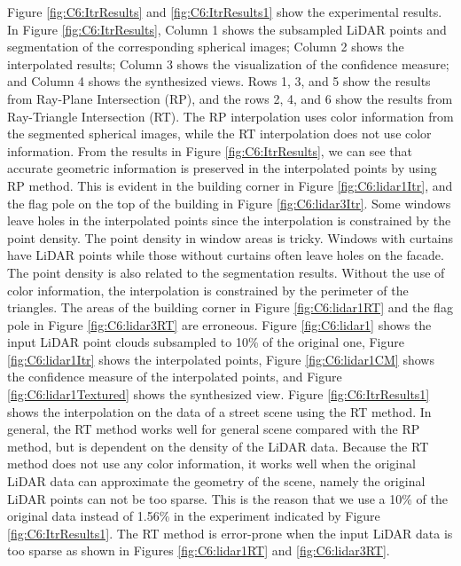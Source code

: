 Figure \ref{fig:C6:ItrResults} and \ref{fig:C6:ItrResults1}
show the experimental results. In Figure \ref{fig:C6:ItrResults},  Column 1 shows the subsampled LiDAR points and segmentation of the corresponding spherical images; Column 2 shows the interpolated results; Column 3 shows the visualization of the confidence measure; and Column 4 shows the synthesized views. Rows 1, 3, and 5 show the results from Ray-Plane Intersection (RP), and the rows 2, 4, and 6 show the results from Ray-Triangle Intersection (RT). The RP interpolation uses color information from the segmented spherical images, while the RT interpolation does not use color information. From the results in Figure \ref{fig:C6:ItrResults}, we can see that accurate geometric information is preserved in the interpolated points by using RP method. This is evident in the building corner in Figure \ref{fig:C6:lidar1Itr}, and the flag pole on the top of the building in Figure \ref{fig:C6:lidar3Itr}. Some windows leave holes in the interpolated points since the interpolation is constrained by the point density. The point density in window areas is tricky. Windows with curtains have LiDAR points while those without curtains often leave holes on the facade. The point density is also related to the segmentation results. Without the use of color information, the interpolation is constrained by the perimeter of the triangles. The areas of the building corner in Figure \ref{fig:C6:lidar1RT} and the flag pole in Figure \ref{fig:C6:lidar3RT} are erroneous.  Figure \ref{fig:C6:lidar1} shows the input LiDAR point clouds subsampled to 10\% of the original one, Figure \ref{fig:C6:lidar1Itr} shows the interpolated points, Figure \ref{fig:C6:lidar1CM} shows the confidence measure of the interpolated points, and Figure \ref{fig:C6:lidar1Textured} shows the synthesized view. 
Figure \ref{fig:C6:ItrResults1} shows the interpolation on the data of a street scene using the RT method. In general, the RT method works well for general scene compared with the RP method, but is dependent on the density of the LiDAR data. Because the RT method does not use any color information, it works well when the original LiDAR data can approximate the geometry of the scene, namely the original LiDAR points can not be too sparse. This is the reason that we use a 10\% of the original data instead of  1.56\% in the experiment indicated by Figure \ref{fig:C6:ItrResults1}. The RT method is error-prone when the input LiDAR data is too sparse as shown in Figures \ref{fig:C6:lidar1RT} and \ref{fig:C6:lidar3RT}.    


